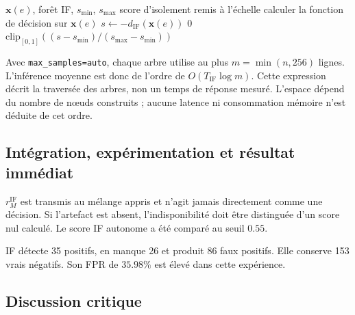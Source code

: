 \documentclass[11pt,a4paper,oneside]{report}
\theoremstyle{definition}
\theoremstyle{plain}
\begin{document}
\begin{algorithm}[H]
\caption{Inférence par forêt d'isolation}
\label{alg:ai-ro-if}
\begin{algorithmic}[1]
\Require $\mathbf{x}(e)$, forêt IF, $s_{\min}$, $s_{\max}$
\Ensure score d'isolement remis à l'échelle
\State calculer la fonction de décision sur $\mathbf{x}(e)$
\State $s\leftarrow-d_{\mathrm{IF}}(\mathbf{x}(e))$
  \State \Return $0$
\Else
  \State \Return $\mathrm{clip}_{[0,1]}((s-s_{\min})/(s_{\max}-s_{\min}))$
\EndIf
\end{algorithmic}
\end{algorithm}

Avec \texttt{max\_samples=auto}, chaque arbre utilise au plus
$m=\min(n,256)$ lignes. L'inférence moyenne est donc de l'ordre de
$O(T_{\mathrm{IF}}\log m)$. Cette expression décrit la traversée des arbres,
non un temps de réponse mesuré. L'espace dépend du nombre de nœuds construits ;
aucune latence ni consommation mémoire n'est déduite de cet ordre.

\subsection*{Intégration, expérimentation et résultat immédiat}

$r_M^{\mathrm{IF}}$ est transmis au mélange appris et n'agit jamais directement comme une décision. Si l'artefact est absent, l'indisponibilité doit être distinguée d'un score nul calculé. Le score IF autonome a été comparé au seuil $0.55$.

\begin{table}[H]
\centering
\caption{Résultat archivé d'IF, $n=300$, seuil $0.55$.}
\label{tab:method-if-results}
\small
{}
\end{table}

IF détecte 35 positifs, en manque 26 et produit 86 faux positifs. Elle conserve 153 vrais négatifs. Son FPR de $35.98\%$ est élevé dans cette expérience.

\subsection*{Discussion critique}
\end{document}
